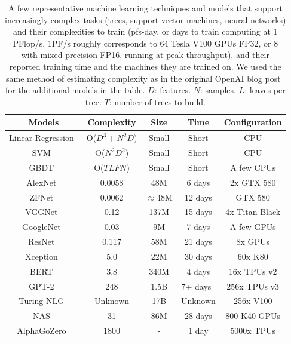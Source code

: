 \begin{table}
\centering
\begin{tabular}{|c|c|c|c|c|}
  \hline
  Models & Complexity & Size & Time & Configuration \\
  \hline
  Linear Regression~\cite{seber2012linear} & O($D^3+ N^2D$) & Small & Short & CPU \\
  \hline
  SVM~\cite{wang2005support} & O($N^2D^2$) & Small & Short & CPU \\
  \hline
  GBDT~\cite{friedman2001greedy} & O($TLFN$) & Small & Short & A few CPUs \\
  \hline
  \hline 
  AlexNet~\cite{alexnet}   & 0.0058 & 48M & 6 days  & 2x GTX 580\\
  \hline
  ZFNet~\cite{ZFNet}   & 0.0062  &  $\approx$48M  & 12 days  & GTX 580\\
  \hline
  VGGNet~\cite{VGGNet}   & 0.12  & 137M & 15 days & 4x Titan Black\\
  \hline
  GoogleNet~\cite{GoogleNet}   & 0.03  & 9M & 7 days & A few GPUs\\
  \hline
  ResNet~\cite{RESNET}   & 0.117 &  58M & 21 days & 8x GPUs\\
  \hline
  Xception~\cite{Chollet_2017}  & 5.0  & 22M & 30 days & 60x K80\\
  \hline
  \hline
  BERT~\cite{bert}  & 3.8 & 340M & 4 days & 16x TPUs v2 \\
  \hline
  GPT-2~\cite{GPT2}  & 248 & 1.5B & 7+ days~\cite{gpt2Time} & 256x TPUs v3 \\
  \hline
  Turing-NLG~\cite{TuringNL61:online}  & Unknown & 17B & Unknown & 256x V100 \\
  \hline
  \hline
  NAS~\cite{zoph2016neural}  & 31 & 86M & 28 days & 800 K40 GPUs\\
  \hline
  AlphaGoZero~\cite{silver2016mastering}  & 1800 & - & 1 day & 5000x TPUs \\
  \hline
\end{tabular}
\caption{A few representative machine learning techniques and models that support increasingly complex tasks (trees, support vector machines, neural networks) and their complexities to train (pfs-day, or days to train computing at 1 PFlop/s. 1PF/s roughly corresponds to 64 Tesla V100 GPUs FP32, or 8 with mixed-precision FP16, running at peak throughput), and their reported training time and the machines they are trained on. We used the same method of estimating complexity as in the original OpenAI blog post~\cite{AIandCom3:online} for the additional models in the table. $D$: features. $N$: samples. $L$: leaves per tree. $T$: number of trees to build.}
\label{table:trend}
\end{table}

